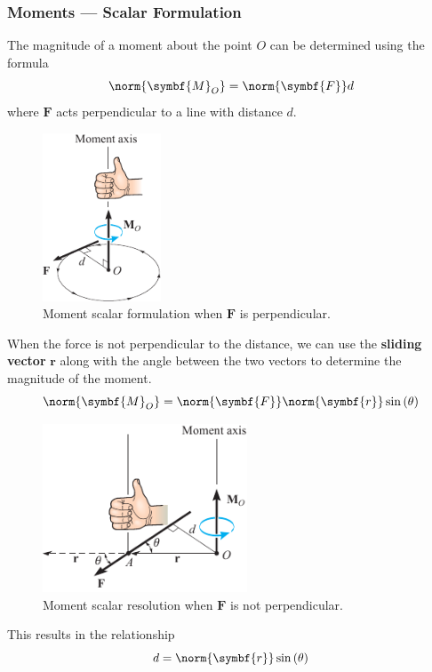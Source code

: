 \documentclass{article}
\begin{document}
\subsubsection{Moments --- Scalar Formulation}
The magnitude of a moment about the point \(O\) can be determined using the formula
\begin{equation*}
    \norm{\symbf{M}_O} = \norm{\symbf{F}} d
\end{equation*}
where \(\symbf{F}\) acts perpendicular to a line with distance \(d\).
\begin{figure}[H]
    \centering
    \includegraphics[height = 5cm, keepaspectratio = true]{figures/moment_scalar_perpendicular.pdf}
    \caption{Moment scalar formulation when \(\symbf{F}\) is perpendicular.} %
\end{figure}
When the force is not perpendicular to the distance,
we can use the \textbf{sliding vector} \(\symbf{r}\) along with the angle between the two vectors to determine
the magnitude of the moment.
\begin{equation*}
    \norm{\symbf{M}_O} = \norm{\symbf{F}} \norm{\symbf{r}} \sin{\left( \theta \right)}
\end{equation*}
\begin{figure}[H]
    \centering
    \includegraphics[height = 5cm, keepaspectratio = true]{figures/moment_scalar.pdf}
    \caption{Moment scalar resolution when \(\symbf{F}\) is not perpendicular.} %
\end{figure}
This results in the relationship
\begin{equation*}
    d = \norm{\symbf{r}} \sin{\left( \theta \right)}
\end{equation*}
\end{document}
